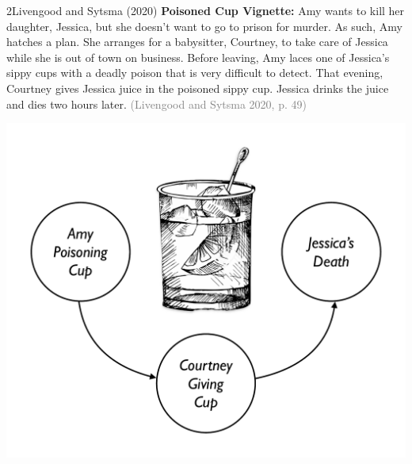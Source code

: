 \documentclass[xcolor=table,9pt,aspectratio=169]{beamer}
\begin{document}
\begin{frame}{\vspace*{10mm}2\hspace*{1em}Livengood and Sytsma (2020)}
\vspace*{-5mm}
\textbf{Poisoned Cup Vignette:} Amy wants to kill her daughter, Jessica, but she doesn't want to go to prison for murder. As such, Amy hatches a plan. She arranges for a babysitter, Courtney, to take care of Jessica while she is out of town on business. Before leaving, Amy laces one of Jessica's sippy cups with a deadly poison that is very difficult to detect. That evening, Courtney gives Jessica juice in the poisoned sippy cup. Jessica drinks the juice and dies two hours later. \textcolor{gray}{(Livengood and Sytsma 2020, p. 49)}
\begin{center}
   \includegraphics[width=0.3\linewidth]{figures/poison.pdf}
\end{center}
\end{frame}
\end{document}

